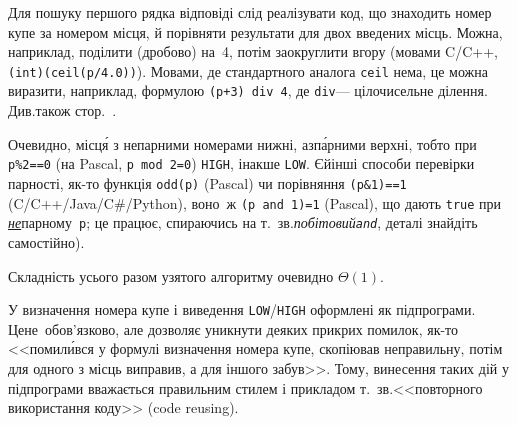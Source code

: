 \Tutorial 
Для пошуку першого рядка відповіді слід реалізувати код, що знаходить номер купе за номером місця, й порівняти результати для двох введених місць. 
Можна, наприклад, поділити (дробово) на~4, потім заокруглити вгору (мовами C/C++, \verb"(int)(ceil(p/4.0))").
Мовами, де стандартного аналога \texttt{ceil} нема, це можна виразити, наприклад, формулою \verb"(p+3) div 4", де \verb"div"\nolinebreak[3] --- цілочисельне ділення. Див.\nolinebreak[2] також стор.~\pageref{text:about-good-formulae-for-0-based-numbering}.


Очевидно, місц\'{я} з непарними номерами нижні, а\nolinebreak[3] з\nolinebreak[3] п\'{а}рними верхні, тобто при 
\verb"p%2==0" (на Pascal, \verb"p mod 2=0") \verb"HIGH", інакше \verb"LOW".
Є\nolinebreak[3] й\nolinebreak[3] інші способи перевірки парності, як-то функція \verb"odd(p)" (Pascal) чи порівняння \verb"(p&1)==1" (C/C++/\linebreak[2]Java/\linebreak[2]C\#/Python), воно~ж \verb"(p and 1)=1" (Pascal), що дають \verb"true" при \underline{\emph{не}}пар\-ному~\verb"p"; це працює, 
спираючись на т.~зв.\nolinebreak[2] \emph{побітовий\nolinebreak[2] \texttt{and}}, деталі знайдіть самостійно).

Складність усього разом узятого алгоритму очевидно $\Theta(1)$.


У  визначення номера купе і виведення \texttt{LOW}/\texttt{HIGH} оформлені як підпрограми. Це\nolinebreak[2] не~обов'язково, але дозволяє уникнути деяких прикрих помилок, як-то <<помил\'{и}вся у формулі визначення номера купе, скопіював неправильну, потім для одного з місць виправив, а для іншого забув>>. Тому, винесення таких дій у підпрограми вважається правильним стилем і прикладом т.~зв.\nolinebreak[1] <<повторного використання коду>> (code reusing).

